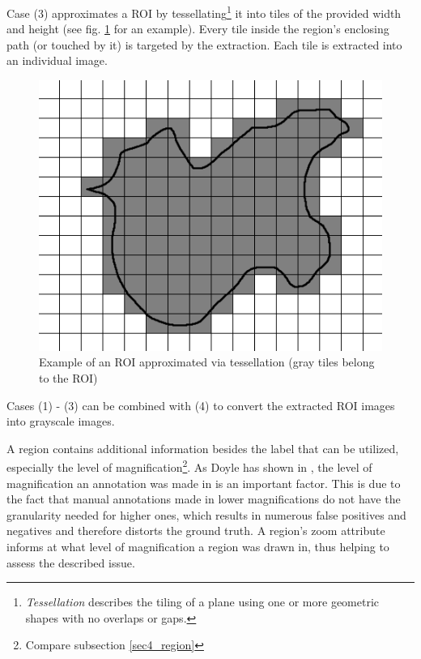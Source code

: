 Case (3) approximates a ROI by tessellating\footnote{
	\emph{Tessellation} describes the tiling of a plane using one or more geometric shapes with no overlaps or gaps\cite{Clifford09}.
} it into tiles of the provided width and height (see fig. \ref{fig5_tesExample} for an example). Every tile inside the region's enclosing path (or touched by it) is targeted by the extraction. Each tile is extracted into an individual image.

\begin{figure}[H]
	\begin{center}
		\includegraphics[scale=0.5]{img/tessellation.png}
		\caption{Example of an ROI approximated via tessellation (gray tiles belong to the ROI)}
		\label{fig5_tesExample}
	\end{center}
\end{figure}

Cases (1) - (3) can be combined with (4) to convert the extracted ROI images into grayscale images.

A region contains additional information besides the label that can be utilized, especially the level of magnification\footnote{
	Compare subsection \ref{sec4_region}
}. As Doyle has shown in \cite{Doyle10}, the level of magnification an annotation was made in is an important factor. This is due to the fact that manual annotations made in lower magnifications do not have the granularity needed for higher ones, which results in numerous false positives and negatives and therefore distorts the ground truth\cite{Janowczyk16}. A region's zoom attribute informs at what level of magnification a region was drawn in, thus helping to assess the described issue.

